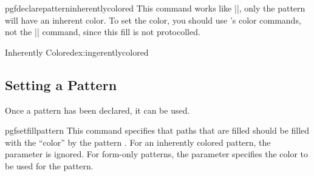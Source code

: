 \begin{docCommand}{pgfdeclarepatterninherentlycolored}{
    }
  This command works like |\pgfdeclarepatternuncolored|, only the
  pattern will have an inherent color. To set the color, you should
  use \pgfname's color commands, not the |\color| command, since this
  fill is not protocolled.
\end{docCommand}

\begin{texexample}{Inherently Colored}{ex:ingerentlycolored}
{\pgfpointorigin}{\pgfpoint{1cm}{1cm}}
{\pgfpoint{1cm}{1cm}}
{
  \pgftransformshift{\pgfpoint{.5cm}{.5cm}}
  \pgfpathclose%
}
\end{texexample}



\subsection{Setting a Pattern}

Once a pattern has been declared, it can be used.

\begin{docCommand}{pgfsetfillpattern}{}
  This command specifies that paths that are filled should be filled
  with the ``color'' by the pattern . For an inherently
  colored pattern, the  parameter is ignored. For
  form-only patterns, the  parameter specifies the color
  to be used for the pattern.
\end{docCommand}
  
\begin{codeexample}[]
\end{codeexample}



